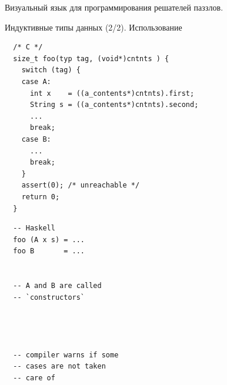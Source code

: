 \documentclass[aspectratio=169
  , xcolor={svgnames}
  , hyperref={ colorlinks,citecolor=DeepPink4
             , linkcolor=DarkRed,urlcolor=DarkBlue}
  , russian
  ]{beamer}
\theoremstyle{exerciseStyle1}
\begin{document}
\begin{frame}[fragile]
\begin{minipage}{.38\textwidth}
Визуальный язык для программирования решателей паззлов.
\end{minipage}
\end{frame}

\begin{frame}[fragile]{Индуктивные типы данных (2/2). Использование}


\begin{minipage}{.65\textwidth}
  \begin{verbatim}
  /* C */
  size_t foo(typ tag, (void*)cntnts ) {
    switch (tag) {
    case A: 
      int x    = ((a_contents*)cntnts).first;
      String s = ((a_contents*)cntnts).second;
      ...
      break;
    case B:
      ...
      break;
    }    
    assert(0); /* unreachable */
    return 0;
  }
  \end{verbatim}
\end{minipage}
\begin{minipage}{.3\textwidth}
  \begin{verbatim}
  -- Haskell
  foo (A x s) = ...
  foo B       = ...


  -- A and B are called 
  -- `constructors`
  
  
  
  
  -- compiler warns if some
  -- cases are not taken
  -- care of
  \end{verbatim}
\end{minipage}
\end{frame}
\end{document}
